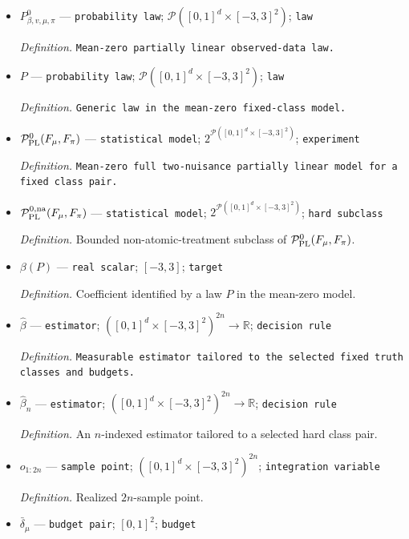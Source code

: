 \documentclass{article}
\begin{document}
\begin{itemize}
  \item \(P_{\beta,v,\mu,\pi}^0\) --- \texttt{probability law}; \(\mathcal P([0,1]^d\times[-3,3]^2)\); \texttt{law}
  \par\smallskip\noindent\emph{Definition.} \texttt{Mean-\allowbreak{}zero partially linear observed-\allowbreak{}data law.}
  \item \(P\) --- \texttt{probability law}; \(\mathcal P([0,1]^d\times[-3,3]^2)\); \texttt{law}
  \par\smallskip\noindent\emph{Definition.} \texttt{Generic law in the mean-\allowbreak{}zero fixed-\allowbreak{}class model.}
  \item \(\mathcal P_{\rm PL}^{0}(F_\mu,F_\pi)\) --- \texttt{statistical model}; \(2^{\mathcal P([0,1]^d\times[-3,3]^2)}\); \texttt{experiment}
  \par\smallskip\noindent\emph{Definition.} \texttt{Mean-\allowbreak{}zero full two-\allowbreak{}nuisance partially linear model for a fixed class pair.}
  \item \(\mathcal P_{\rm PL}^{0,\rm na}(F_\mu,F_\pi)\) --- \texttt{statistical model}; \(2^{\mathcal P([0,1]^d\times[-3,3]^2)}\); \texttt{hard subclass}
  \par\smallskip\noindent\emph{Definition.} Bounded non-atomic-treatment subclass of \(\mathcal P_{\rm PL}^{0}(F_\mu,F_\pi)\).
  \item \(\beta(P)\) --- \texttt{real scalar}; \([-3,3]\); \texttt{target}
  \par\smallskip\noindent\emph{Definition.} Coefficient identified by a law \(P\) in the mean-zero model.
  \item \(\widehat\beta\) --- \texttt{estimator}; \(([0,1]^d\times[-3,3]^2)^{2n}\to\mathbb R\); \texttt{decision rule}
  \par\smallskip\noindent\emph{Definition.} \texttt{Measurable estimator tailored to the selected fixed truth classes and budgets.}
  \item \(\widehat\beta_n\) --- \texttt{estimator}; \(([0,1]^d\times[-3,3]^2)^{2n}\to\mathbb R\); \texttt{decision rule}
  \par\smallskip\noindent\emph{Definition.} An \(n\)-indexed estimator tailored to a selected hard class pair.
  \item \(o_{1:2n}\) --- \texttt{sample point}; \(([0,1]^d\times[-3,3]^2)^{2n}\); \texttt{integration variable}
  \par\smallskip\noindent\emph{Definition.} Realized \(2n\)-sample point.
  \item \(\bar\delta_\mu\) --- \texttt{budget pair}; \([0,1]^2\); \texttt{budget}

\end{itemize}
\end{document}
